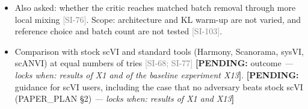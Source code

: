 \documentclass[11pt]{article}
\newcommand{\src}[1]{{\scriptsize\textcolor{gray}{[#1]}}}
\newcommand{\pending}[2]{{\color{BurntOrange}\textbf{[PENDING:} #1 \textit{--- locks when: #2}\textbf{]}}}
\begin{document}
\begin{itemize}
\begin{enumerate}
\end{enumerate}
\item Also asked: whether the critic reaches matched batch removal through more local mixing \src{SI-76}. Scope: architecture and KL warm-up are not varied, and reference choice and batch count are not tested \src{SI-103}.
\item Comparison with stock scVI and standard tools (Harmony, Scanorama, sysVI, scANVI) at equal numbers of tries \src{SI-68; SI-77} \pending{outcome}{results of X1 and of the baseline experiment X13}. \pending{guidance for scVI users, including the case that no adversary beats stock scVI (PAPER\_PLAN \S2)}{results of X1 and X13}
\end{itemize}

\end{document}
